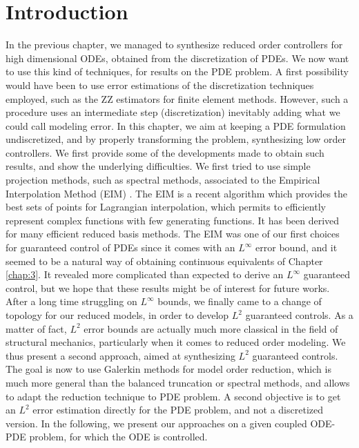 \section{Introduction}

In the previous chapter, we managed to synthesize reduced order controllers
for high dimensional ODEs, obtained from the discretization of PDEs.
We now want to use this kind of techniques, for results on the PDE problem.
A first possibility would have been to use error estimations of the 
discretization techniques employed, such as the ZZ estimators \cite{zienkiewicz1987simple}
for finite element methods. 
However, such a procedure uses an intermediate step (discretization) inevitably adding 
what we could call modeling error. 
In this chapter, we aim at keeping a PDE formulation undiscretized, and by properly 
transforming the problem, synthesizing low order controllers.
We first provide some of the developments made to obtain such results, and show the 
underlying difficulties. We first tried to use simple projection methods, such as 
spectral methods, associated to the Empirical Interpolation Method (EIM) \cite{maday2007general}.
The EIM is a recent algorithm which provides the best sets of points for Lagrangian interpolation,
which permits to efficiently represent complex functions with few generating functions. 
It has been derived for many efficient reduced basis methods.
The EIM was one of our first choices for guaranteed control of PDEs since it comes with
an $L^\infty$ error bound, and it seemed to be a natural way of obtaining 
continuous equivalents of Chapter \ref{chap:3}.
It revealed more complicated than expected to derive an $L^\infty$
guaranteed control, but we hope that these results might be of interest for 
future works.
After a long time struggling on $L^\infty$ bounds, we finally 
came to a change of topology for our reduced models, in order to 
develop $L^2$ guaranteed controls. As a matter of fact,
$L^2$ error bounds are actually much more classical 
in the field of structural mechanics, particularly when it comes 
to reduced order modeling. 
We thus present a second approach, aimed at synthesizing $L^2$
guaranteed controls.
The goal is now to use Galerkin methods for model order reduction, which is much more 
general than the balanced truncation or spectral methods, and allows to adapt the reduction 
technique to PDE problem. A second objective is to get an $L^2$ error estimation directly
for the PDE problem, and not a discretized version. 
In the following, we present our approaches on a given coupled ODE-PDE problem, for which the ODE is 
controlled.

